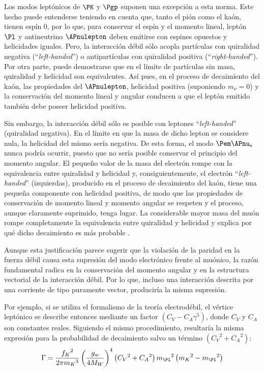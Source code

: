 Los modos leptónicos de $\PK$ y $\Pgp$ suponen una excepción a esta norma. Este hecho puede entenderse teniendo en cuenta que, tanto el pión como el kaón, tienen espín 0, por lo que, para conservar el espín y el momento lineal, leptón $\Pl$ y antineutrino $\APnulepton$ deben emitirse con espines opuestos y helicidades iguales. Pero, la interacción débil sólo acopla partículas con quiralidad negativa (``\textit{left-handed}'') o antipartículas con quiralidad positiva (``\textit{right-handed}''). Por otra parte, puede demostrarse que en el límite de partículas sin masa, quiralidad y helicidad son equivalentes. Así pues, en el proceso de decaimiento del kaón, las propiedades del $\APnulepton$, helicidad positiva (suponiendo $m_{\nu}=0$) y la conservación del momento lineal y angular conducen a que el leptón emitido también debe poseer helicidad positiva.

Sin embargo, la interacción débil sólo es posible con leptones ``\textit{left-handed}'' (quiralidad negativa). En el límite en que la masa de dicho lepton se considere nula, la helicidad del mismo sería negativa. De esta forma, el modo $\Pem \APnu_{e}$ nunca podría ocurrir, puesto que no sería posible conservar el principio del momento angular. El pequeño valor de la masa del electrón rompe con la equivalencia entre quiralidad y helicidad y, consiguientemente, el electrón ``\textit{left-handed}'' (izquierdas), producido en el proceso de decaimiento del kaón, tiene una pequeña componente con helicidad positiva, de modo que las propiedades de conservación de momento lineal y momento angular se respeten y el proceso, aunque claramente suprimido, tenga lugar. La considerable mayor masa del muón rompe completamente la equivalencia entre quiralidad y helicidad y explica por qué dicho decaimiento es más probable \cite{Griffiths2008} \cite{Halzen}.

Aunque esta justificación parece sugerir que la violación de la paridad en la fuerza débil causa esta supresión del modo electrónico frente al muónico, la razón fundamental radica en la conservación del momento angular y en la estructura vectorial de la interacción débil. Por lo que, incluso una interacción descrita por una corriente de tipo puramente vector, produciría la misma supresión. 

Por ejemplo, si se utiliza el formalismo de la teoría electrodébil, el vértice leptónico se describe entonces mediante un factor $\left( C_{V}-C_{A}\gamma^{5} \right)$, donde $C_{V}$ y $C_{A}$ son constantes reales. Siguiendo el mismo procedimiento, resultaría la misma expresión para la probabilidad de decaimiento salvo un término $\left( {C_{V}}^2+{C_{A}}^2\right)$:
\begin{equation}
\Gamma =\dfrac{{f_{K}}^{2}}{2\pi {m_{K}}^{3}}\left( \dfrac{g_w}{4M_W}\right)^{4}\left( {C_{V}}^2+{C_{A}}^2\right){m_{\Pl}}^{2}\left({m_{K}}^{2}-{m_{\Pl}}^{2}\right)\label{eq:decayrateEWt}
\end{equation}

